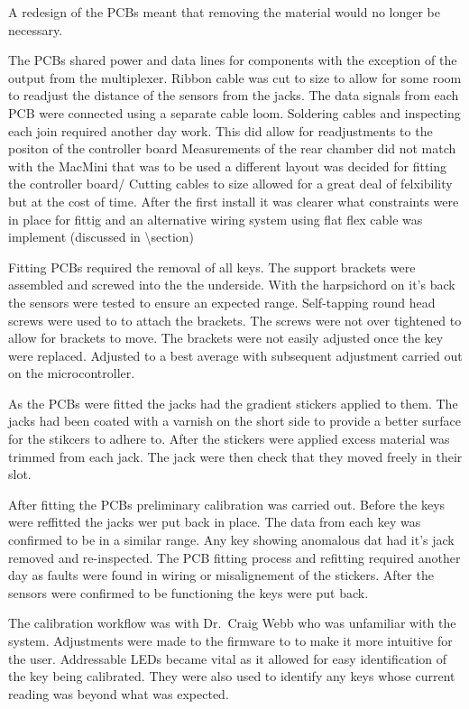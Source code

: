 A redesign of the PCBs meant that removing the material would no longer
be necessary.

The PCBs shared power and data lines for components with the exception
of the output from the multiplexer. Ribbon cable was cut to size to
allow for some room to readjust the distance of the sensors from the
jacks. The data signals from each PCB were connected using a separate
cable loom. Soldering cables and inspecting each join required another
day work. This did allow for readjustments to the positon of the
controller board Measurements of the rear chamber did not match with the
MacMini that was to be used a different layout was decided for fitting
the controller board/ Cutting cables to size allowed for a great deal of
felxibility but at the cost of time. After the first install it was
clearer what constraints were in place for fittig and an alternative
wiring system using flat flex cable was implement (discussed in
\textbackslash section)

Fitting PCBs required the removal of all keys. The support brackets were
assembled and screwed into the the underside. With the harpsichord on
it's back the sensors were tested to ensure an expected range.
Self-tapping round head screws were used to to attach the brackets. The
screws were not over tightened to allow for brackets to move. The
brackets were not easily adjusted once the key were replaced. Adjusted
to a best average with subsequent adjustment carried out on the
microcontroller.

As the PCBs were fitted the jacks had the gradient stickers applied to
them. The jacks had been coated with a varnish on the short side to
provide a better surface for the stikcers to adhere to. After the
stickers were applied excess material was trimmed from each jack. The
jack were then check that they moved freely in their slot.

After fitting the PCBs preliminary calibration was carried out. Before
the keys were reffitted the jacks wer put back in place. The data from
each key was confirmed to be in a similar range. Any key showing
anomalous dat had it's jack removed and re-inspected. The PCB fitting
process and refitting required another day as faults were found in
wiring or misalignement of the stickers. After the sensors were
confirmed to be functioning the keys were put back.

The calibration workflow was with Dr.~Craig Webb who was unfamiliar with
the system. Adjustments were made to the firmware to to make it more
intuitive for the user. Addressable LEDs became vital as it allowed for
easy identification of the key being calibrated. They were also used to
identify any keys whose current reading was beyond what was expected.

